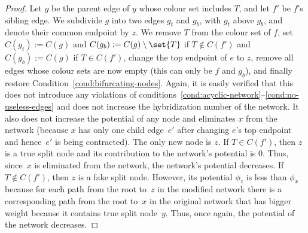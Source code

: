 \begin{proof}
  Let $g$ be the   parent edge of $y$ whose colour set includes $T$, and let $f'$ be $f$'s   sibling edge.   We subdivide $g$ into two edges $g_t$ and $g_b$, with $g_t$ above $g_b$, and   denote their common endpoint by $z$.   We remove $T$ from the colour set of $f$, set $C(g_t) := C(g)$ and $C(g_b) := C(g) \setminus \set{T}$ if $T\notin C(f')$ and $C(g_b) := C(g)$ if $T\in C(f')$, change the top endpoint of $e$   to $z$, remove all edges whose colour sets are now empty (this can only be $f$   and $g_b$), and finally restore Condition~\ref{cond:bifurcating-nodes}.   Again, it is easily verified that this does not introduce any violations of   conditions~\ref{cond:acyclic-network}--\ref{cond:no-useless-edges} and   does not increase the hybridization number of the network.   It also does not increase the potential of any node and eliminates $x$ from the network (because $x$ has only one child edge~$e'$ after changing $e$'s top endpoint and hence~$e'$ is being contracted).   The only new node is $z$.   If $T \in C(f')$, then $z$ is a true split node and its contribution to the network's potential is $0$.   Thus, since~$x$ is eliminated from the network, the network's potential decreases.   If $T \notin C(f')$, then $z$ is a fake split node.   However, its potential $\phi_z$ is less than $\phi_x$ {because for each path from the root to~$z$ in the modified network there is a corresponding path from the root to~$x$ in the original network that has bigger weight because it contains true split node~$y$.}   Thus, once again, the potential of the network decreases.


\end{proof}
